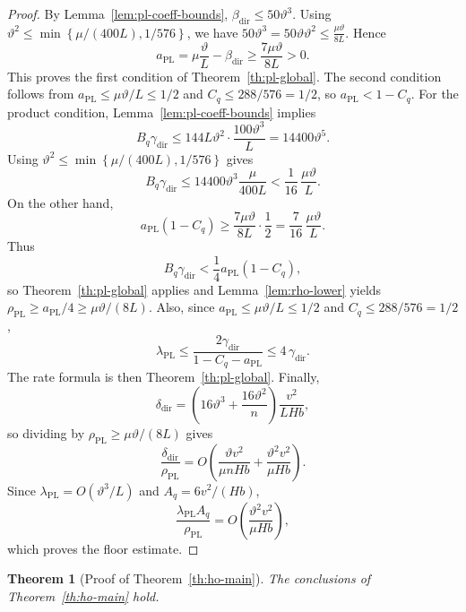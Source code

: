 \documentclass{article}
\newtheorem{theorem}{Theorem}[section]
\theoremstyle{definition}
\begin{document}
\begin{proof}
By Lemma~\ref{lem:pl-coeff-bounds}, $
\beta_{\mathrm{dir}}\le 50\vartheta^3$.
Using $\vartheta^2\le \min\!\left\{\mu/(400L),1/576\right\}$, we have $
50\vartheta^3=50\vartheta\vartheta^2\le \frac{\mu\vartheta}{8L}$.
Hence
\[
a_{\mathrm{PL}}=\mu\frac{\vartheta}{L}-\beta_{\mathrm{dir}}\ge \frac{7\mu\vartheta}{8L}>0.
\]
This proves the first condition of Theorem~\ref{th:pl-global}. The second
condition follows from $a_{\mathrm{PL}}\le \mu\vartheta/L\le 1/2$ and $C_q\le 288/576=1/2$, so $a_{\mathrm{PL}}<1-C_q$. For the product condition, Lemma~\ref{lem:pl-coeff-bounds}
implies
\[
B_q\gamma_{\mathrm{dir}}\le 144L\vartheta^2\cdot \frac{100\vartheta^3}{L}=14400\vartheta^5.
\]
Using $\vartheta^2\le \min\!\left\{\mu/(400L),1/576\right\}$ gives
\[
B_q\gamma_{\mathrm{dir}}\le 14400\vartheta^3\frac{\mu}{400L}<\frac{1}{16}\,\frac{\mu\vartheta}{L}.
\]
On the other hand,
\[
a_{\mathrm{PL}}(1-C_q)\ge \frac{7\mu\vartheta}{8L}\cdot \frac12=\frac{7}{16}\,\frac{\mu\vartheta}{L}.
\]
Thus
\[
B_q\gamma_{\mathrm{dir}}<\frac14 a_{\mathrm{PL}}(1-C_q),
\]
so Theorem~\ref{th:pl-global} applies and Lemma~\ref{lem:rho-lower} yields
$\rho_{\mathrm{PL}}\ge a_{\mathrm{PL}}/4\ge \mu\vartheta/(8L)$. Also, since $a_{\mathrm{PL}}\le \mu\vartheta/L\le 1/2$ and $C_q\le 288/576=1/2$,
\[
\lambda_{\mathrm{PL}}
\le
\frac{2\gamma_{\mathrm{dir}}}{1-C_q-a_{\mathrm{PL}}}
\le
4\,\gamma_{\mathrm{dir}}.
\]
The rate formula is then Theorem~\ref{th:pl-global}. Finally,
\[
\delta_{\mathrm{dir}}=
\left(16\vartheta^3+\frac{16\vartheta^2}{n}\right)\frac{v^2}{L H b},
\]
so dividing by $\rho_{\mathrm{PL}}\ge \mu\vartheta/(8L)$ gives
\[
\frac{\delta_{\mathrm{dir}}}{\rho_{\mathrm{PL}}}
=
O\!\left(\frac{\vartheta v^2}{\mu n H b}+\frac{\vartheta^2 v^2}{\mu H b}\right).
\]
Since $\lambda_{\mathrm{PL}}=O(\vartheta^3/L)$ and $A_q=6v^2/(Hb)$,
\[
\frac{\lambda_{\mathrm{PL}}A_q}{\rho_{\mathrm{PL}}}
=
O\!\left(\frac{\vartheta^2 v^2}{\mu H b}\right),
\]
which proves the floor estimate.
\end{proof}
\begin{theorem}[Proof of Theorem~\ref{th:ho-main}]
\label{th:ho-main-proof}
The conclusions of Theorem~\ref{th:ho-main} hold.
\end{theorem}
\end{document}
